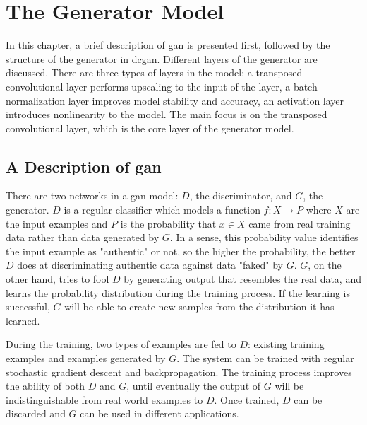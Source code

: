 
\chapter{The Generator Model}

In this chapter, a brief description of \gls{gan} is presented first, followed by the structure of the
generator in \gls{dcgan}. Different layers of the generator are discussed. There are three types of layers
in the model: a transposed convolutional layer performs upscaling to the input of the layer, a batch
normalization layer improves model stability and accuracy, an activation layer introduces nonlinearity
to the model. The main focus is on the transposed convolutional layer, which is the core layer of the
generator model.

\section{A Description of \gls{gan}}

There are two networks in a \gls{gan} model: $D$, the discriminator, and $G$, the generator. $D$ is a regular
classifier which models a function $f: X \rightarrow P$ where $X$ are the input examples and $P$ is the
probability that $x \in X$ came from real training data rather than data generated by $G$. In a sense,
this probability value identifies the input example as "authentic" or not, so the higher the probability,
the better $D$ does at discriminating authentic data against data "faked" by $G$. $G$, on the other hand,
tries to fool $D$ by generating output that resembles the real data, and learns the probability distribution
during the training process. If the learning is successful, $G$ will be able to create new samples from
the distribution it has learned.


During the training, two types of examples are fed to $D$: existing training examples and examples generated
by $G$. The system can be trained with regular stochastic gradient descent and backpropagation. The training
process improves the ability of both $D$ and $G$, until eventually the output of $G$ will be
indistinguishable from real world examples to $D$. Once trained, $D$ can be discarded and $G$ can be used
in different applications.

